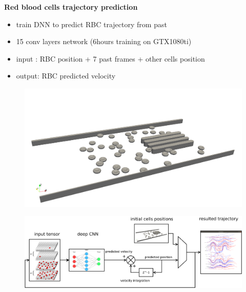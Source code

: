 \documentclass[xcolor=dvipsnames]{beamer}
\begin{document}
\begin{frame}{\bf Red blood cells trajectory prediction}

\begin{itemize}
  \item train DNN to predict RBC trajectory from past
  \item 15 conv layers network (6hours training on GTX1080ti)
  \item input : RBC position + 7 past frames + other cells position
  \item output: RBC predicted velocity
\end{itemize}

\begin{figure}
  \includegraphics[scale=0.1]{../../pictures/rbc_channel.png}
\end{figure}


\begin{figure}
  \includegraphics[scale=0.15]{../../diagrams/cells_prediction_velocity_integration.png}
\end{figure}


\end{frame}
\end{document}

